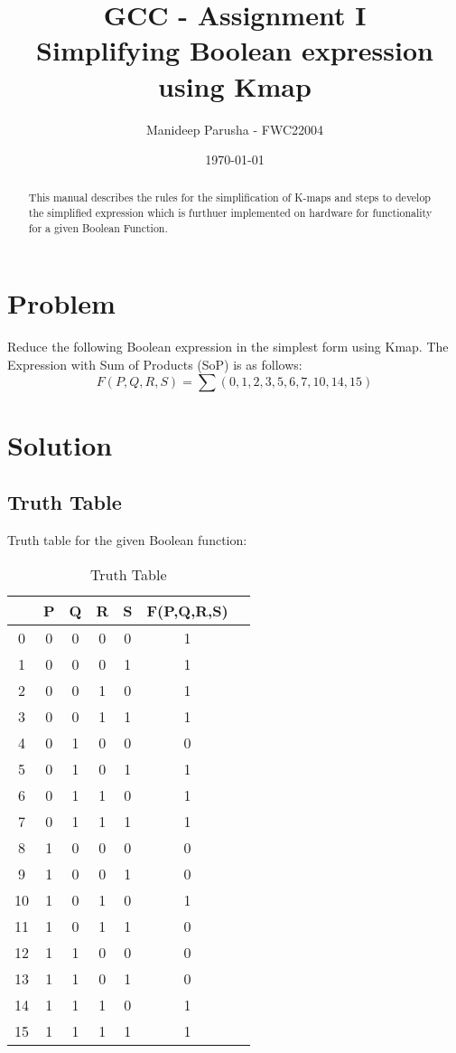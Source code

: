 \documentclass[journal,12pt,twocolumn]{IEEEtran}
\title{GCC - Assignment \textrm{I} \textbf{\\Simplifying Boolean expression using Kmap}}
\author{Manideep Parusha - FWC22004}
\date{\today}
\begin{document}
\maketitle

\tableofcontents 
\bigskip
\begin{abstract}
This manual describes the rules for the simplification of K-maps and steps to develop the simplified expression which is furthuer implemented on hardware for functionality for a given Boolean Function. 
\end{abstract}
\section{Problem}
Reduce the following Boolean expression in the simplest form using Kmap. The Expression with Sum of Products (SoP) is as follows:
$$ {F(P,Q,R,S) = \sum (0,1,2,3,5,6,7,10,14,15)}$$

\newpage
\section{Solution}

\subsection{Truth Table}
Truth table for the given Boolean function:
\begin{table}[h]
    \centering
    \begin{tabular}[20pt]{|c|c|c|c|c||c|c|}
          \hline
          &P&Q&R&S&F(P,Q,R,S) \\
          \hline
          0&0&0&0&0&1\\
          1&0&0&0&1&1\\
          2&0&0&1&0&1\\
          3&0&0&1&1&1\\
          4&0&1&0&0&0\\
          5&0&1&0&1&1\\
          6&0&1&1&0&1\\
          7&0&1&1&1&1\\
          8&1&0&0&0&0\\
          9&1&0&0&1&0\\
          10&1&0&1&0&1\\
          11&1&0&1&1&0\\
          12&1&1&0&0&0\\
          13&1&1&0&1&0\\
          14&1&1&1&0&1\\
          15&1&1&1&1&1\\   
          \hline 
              \end{tabular}
              \bigskip
    \caption{Truth Table}
    \label{Truthtable}
\end{table}
\end{document}
